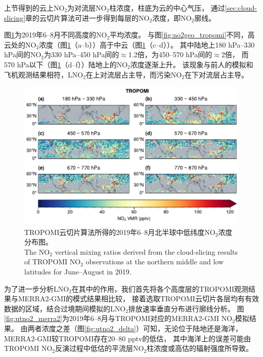 上节得到的云上NO$_2$为对流层NO$_2$柱浓度，柱底为云的中心气压，
通过\ref{sec:cloud-slicing}章的云切片算法可进一步得到每层的NO$_2$浓度，即NO$_2$廓线。

图\ref{fig:utno2_tropomi}为2019年6--8月不同高度的NO$_2$平均浓度。
与图\ref{fig:no2geo_tropomi}不同，高云处的NO$_2$浓度（图\ref{fig:utno2_tropomi}（a--b））高于中云（图\ref{fig:utno2_tropomi}（c--d））。
其中陆地上180 hPa--330 hPa间的NO$_2$为330 hPa--450 hPa间的$\approx$1.2倍，为450--570 hPa间的$\approx$2倍，
而570 hPa以下（图\ref{fig:utno2_tropomi}（d--f））陆地上的NO$_2$浓度逐渐上升。
该现象与前人的模拟和飞机观测结果相符，LNO$_2$在上对流层占主导，而污染NO$_2$在下对流层占主导\citep{Pickering.1996,Ott.2010,Laughner.2017}。


\begin{figure}[!htbp]
    \centering
    \includegraphics[width=15cm]{./figures/utno2_tropomi.pdf}
    \caption{
    TROPOMI云切片算法所得的2019年6--8月北半球中低纬度NO$_2$浓度分布图。 \\
    The NO$_2$ vertical mixing ratios derived from the cloud-slicing results of TROPOMI NO$_2$ observations at the northern middle and low latitudes for June--August in 2019.
    }
    \label{fig:utno2_tropomi}
\end{figure}


为了进一步分析LNO$_2$在其中的作用，我们首先将各个高度层的TROPOMI观测结果与MERRA2-GMI的模式结果相比较，
接着选取TROPOMI云切片各层均有有效数据的区域，结合过境期间模拟的LNO$_2$排放速率垂直分布进行廓线分析。
图\ref{fig:utno2_merra2}为2019年6--8月与TROPOMI对应的MERRA2-GMI NO$_2$模拟结果。
由两者浓度之差（图\ref{fig:utno2_delta}）可知，无论位于陆地还是海洋，MERRA2-GMI较TROPOMI存在20--80 pptv的低估，
其中海洋上的误差可能由TROPOMI NO$_2$反演过程中低估的平流层NO$_2$柱浓度或高估的辐射强度所导致\citep{VanGeffen.2020}。


